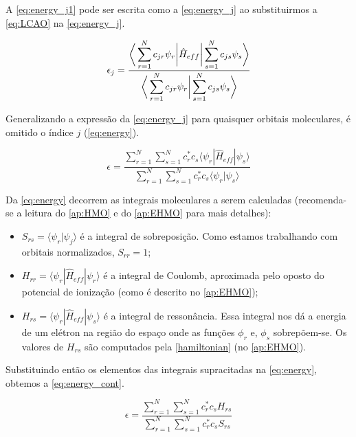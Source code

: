 A \autoref{eq:energy_j1} pode ser escrita como a \autoref{eq:energy_j} ao substituirmos a \autoref{eq:LCAO} na \autoref{eq:energy_j}.

\begin{equation}
\label{eq:energy_j}
    \epsilon_j = \frac{ \displaystyle \bigg{\langle} \sum_{r=1}^{N} c_{jr} \psi_r \bigg{|} \hat{H}_{eff} \bigg{|} \sum_{s=1}^{N} c_{js} \psi_s \bigg{\rangle}}{\displaystyle \bigg{\langle} \sum_{r=1}^{N} c_{jr} \psi_r \bigg{|} \sum_{s=1}^{N} c_{js} \psi_s \bigg{\rangle}}
\end{equation}

Generalizando a expressão da \autoref{eq:energy_j} para quaisquer orbitais moleculares, é omitido o índice $j$ (\autoref{eq:energy}).

\begin{equation}
\label{eq:energy}
    \epsilon = \frac{\displaystyle \sum_{r=1}^{N} \sum_{s=1}^{N} c^*_r c_s \langle \psi_r | \hat{H}_{eff} | \psi_s \rangle}{\displaystyle \sum_{r=1}^{N} \sum_{s=1}^{N} c^*_r c_s \langle \psi_r | \psi_s \rangle}
\end{equation}

Da \autoref{eq:energy} decorrem as integrais moleculares a serem calculadas (recomenda-se a leitura do \autoref{ap:HMO} e do \autoref{ap:EHMO} para mais detalhes):

\begin{itemize}
    \item $\displaystyle S_{rs} = \langle \psi_r | \psi_j \rangle$ é a integral de sobreposição. Como estamos trabalhando com orbitais normalizados, $S_{rr} = 1$;
    
    \item $\displaystyle H_{rr} = \langle \psi_r | \hat{H}_{eff} | \psi_r \rangle$ é a integral de Coulomb, aproximada pelo oposto do potencial de ionização (como é descrito no \autoref{ap:EHMO});
    
    \item $\displaystyle H_{rs} = \langle \psi_r | \hat{H}_{eff} | \psi_s \rangle$ é a integral de ressonância. Essa integral nos dá a energia de um elétron na região do espaço onde as funções $\phi_r$ e, $\phi_s$ sobrepõem-se. Os valores de $H_{rs}$ são computados pela \autoref{hamiltonian} (no \autoref{ap:EHMO}).
\end{itemize}

Substituindo então os elementos das integrais supracitadas na \autoref{eq:energy}, obtemos a \autoref{eq:energy_cont}.

\begin{equation}
\label{eq:energy_cont}
    \epsilon = \frac{\displaystyle \sum_{r=1}^{N} \sum_{s=1}^{N} c^*_r c_s H_{rs}}{\displaystyle \sum_{r=1}^{N} \sum_{s=1}^{N} c^*_r c_s S_{rs}}
\end{equation}

